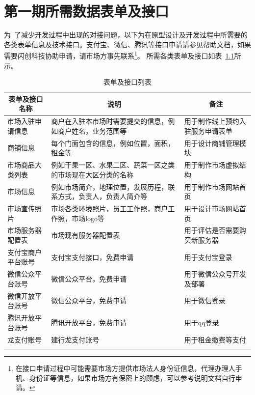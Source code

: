 \documentclass[12pt,a4paper,openany]{ctexrep}
\begin{document}
\chapter{第一期所需数据表单及接口}
\lettrine[lines=2]{为}\, 了减少开发过程中出现的对接问题，以下为在原型设计及开发过程中所需要的各类表单信息及技术接口。支付宝、微信、腾讯等接口申请请参见帮助文档，如果需要闪创科技协助申请，请市场方事先联系\footnote{在接口申请过程中可能需要市场方提供市场法人身份证信息，代理办理人手机、身份证等信息，如果市场方有保密上的顾虑，可以参考说明文档自行申请。}。
所需各类表单及接口如表~\ref{interface}所示。
\begin{longtable}{p{3.5cm}|p{6cm}|p{4.5cm}}
\hline
\multicolumn{1}{c|}{表单及接口名称}		&	\multicolumn{1}{c|}{说明}		&	\multicolumn{1}{c}{备注}		\\
\hline
市场入驻申请信息	&	商户在入驻本市场时需要提交的信息，例如商户姓名，业务范围等	&	用于制作线上预约入驻服务申请表单	\\
\hline
商铺信息			&	每个门面包含的信息，例如位置，面积，租金等						&	用于设计商铺管理模块		\\	
\hline
市场商品大类列表	&	例如干果一区、水果二区、蔬菜一区之类的市场现在大区分类的名称		&	用于制作市场虚拟结构		\\
\hline
市场信息			&	例如市场简介，地理位置，发展历程，联系方式，负责人，负责人简介等		&	用于制作市场网站首页		\\
\hline
市场宣传照片		&	市场各类环境照片，员工工作照，商户工作照，市场logo等			&	用于设计市场网站首页		\\	
\hline
市场服务器配置表	&	市场现有服务器配置表												&	用于评估是否需要购买新服务器		\\
\hline
支付宝商户平台账号	&	支付宝支付接口\footnotemark[1]，免费申请					&	用于支付宝登录	\\
\hline
微信公众平台账号	&	微信公众平台\footnotemark[3]，免费申请							&	用于微信公众号开发及部署		\\	
\hline
微信开放平台账号	&	微信公众平台\footnotemark[4]，免费申请							&	用于微信登录	\\
\hline
腾讯开放平台账号	&	腾讯开放平台\footnotemark[5]，免费申请							&	用于qq登录		\\
\hline
龙支付账号			&	建行龙支付账号														&	用于租金缴费等支付	\\
\hline
\caption{表单及接口列表}
\label{interface}
\end{longtable}
\end{document}
